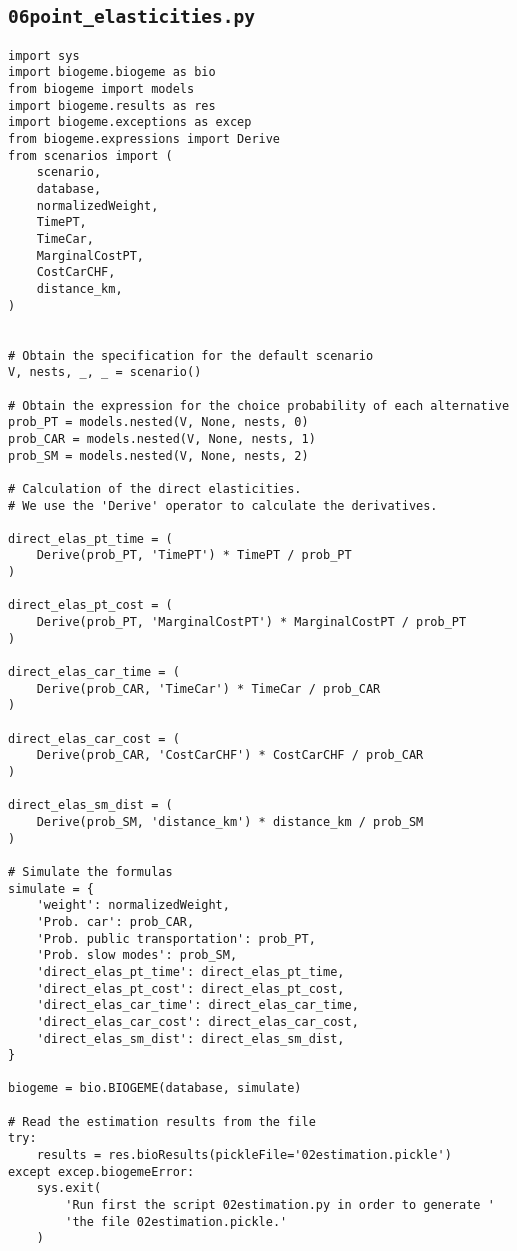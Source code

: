 \documentclass[12pt,a4paper]{article}
\begin{document}
\subsection{\lstinline$06point_elasticities.py$}\label{sec:06point_elasticities}
\begin{lstlisting}[style=numbers]
import sys
import biogeme.biogeme as bio
from biogeme import models
import biogeme.results as res
import biogeme.exceptions as excep
from biogeme.expressions import Derive
from scenarios import (
    scenario,
    database,
    normalizedWeight,
    TimePT,
    TimeCar,
    MarginalCostPT,
    CostCarCHF,
    distance_km,
)


# Obtain the specification for the default scenario
V, nests, _, _ = scenario()

# Obtain the expression for the choice probability of each alternative
prob_PT = models.nested(V, None, nests, 0)
prob_CAR = models.nested(V, None, nests, 1)
prob_SM = models.nested(V, None, nests, 2)

# Calculation of the direct elasticities.
# We use the 'Derive' operator to calculate the derivatives.

direct_elas_pt_time = (
    Derive(prob_PT, 'TimePT') * TimePT / prob_PT
)

direct_elas_pt_cost = (
    Derive(prob_PT, 'MarginalCostPT') * MarginalCostPT / prob_PT
)

direct_elas_car_time = (
    Derive(prob_CAR, 'TimeCar') * TimeCar / prob_CAR
)

direct_elas_car_cost = (
    Derive(prob_CAR, 'CostCarCHF') * CostCarCHF / prob_CAR
)

direct_elas_sm_dist = (
    Derive(prob_SM, 'distance_km') * distance_km / prob_SM
)

# Simulate the formulas
simulate = {
    'weight': normalizedWeight,
    'Prob. car': prob_CAR,
    'Prob. public transportation': prob_PT,
    'Prob. slow modes': prob_SM,
    'direct_elas_pt_time': direct_elas_pt_time,
    'direct_elas_pt_cost': direct_elas_pt_cost,
    'direct_elas_car_time': direct_elas_car_time,
    'direct_elas_car_cost': direct_elas_car_cost,
    'direct_elas_sm_dist': direct_elas_sm_dist,
}

biogeme = bio.BIOGEME(database, simulate)

# Read the estimation results from the file
try:
    results = res.bioResults(pickleFile='02estimation.pickle')
except excep.biogemeError:
    sys.exit(
        'Run first the script 02estimation.py in order to generate '
        'the file 02estimation.pickle.'
    )


\end{lstlisting}
\end{document}
